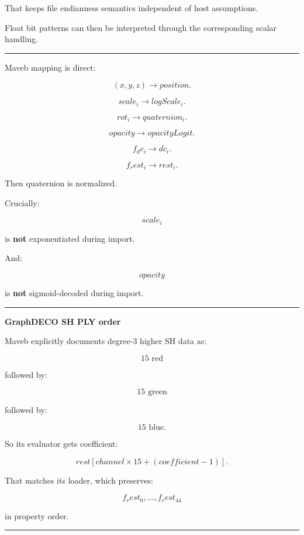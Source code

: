 That keeps file endianness semantics independent of host assumptions.

Float bit patterns can then be interpreted through the corresponding scalar handling.

\begin{center}\rule{0.5\linewidth}{0.5pt}\end{center}

Maveb mapping is direct:

\[
(x,y,z)
\rightarrow
position.
\]

\[
scale_i
\rightarrow
logScale_i.
\]

\[
rot_i
\rightarrow
quaternion_i.
\]

\[
opacity
\rightarrow
opacityLogit.
\]

\[
f_dc_i
\rightarrow
dc_i.
\]

\[
f_rest_i
\rightarrow
rest_i.
\]

Then quaternion is normalized.

Crucially:

\[
scale_i
\]

is \textbf{not} exponentiated during import.

And:

\[
opacity
\]

is \textbf{not} sigmoid-decoded during import.

\begin{center}\rule{0.5\linewidth}{0.5pt}\end{center}

\textbf{GraphDECO SH PLY order}

Maveb explicitly documents degree-3 higher SH data as:

\[
15\text{ red}
\]

followed by:

\[
15\text{ green}
\]

followed by:

\[
15\text{ blue}.
\]

So its evaluator gets coefficient:

\[
\boxed{
rest[
channel\times15
+
(coefficient-1)
].
}
\]

That matches its loader, which preserves:

\[
f_rest_0,\dots,f_rest_{44}
\]

in property order.

\begin{center}\rule{0.5\linewidth}{0.5pt}\end{center}


